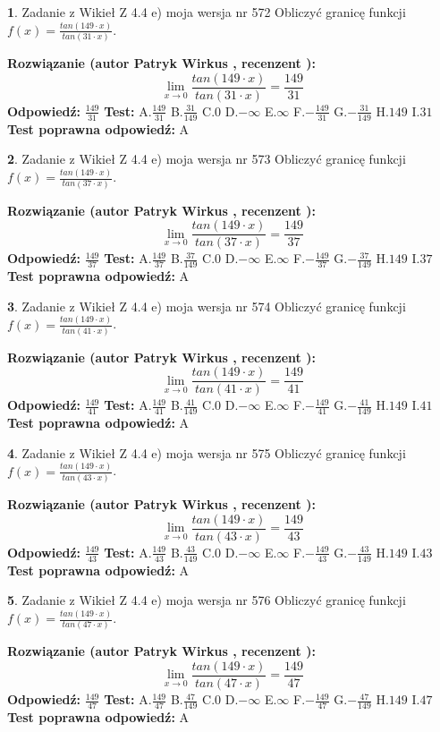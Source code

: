 \documentclass[12pt, a4paper]{article}
\theoremstyle{definition} %
\newtheorem{zad}{}
\newcommand{\zadStart}[1]{\begin{zad}#1\newline}
\newcommand{\zadStop}{\end{zad}}
\newcommand{\rozwStart}[2]{\noindent \textbf{Rozwiązanie (autor #1 , recenzent #2): }\newline}
\newcommand{\rozwStop}{\newline}
\newcommand{\odpStart}{\noindent \textbf{Odpowiedź:}\newline}
\newcommand{\odpStop}{\newline}
\newcommand{\testStart}{\noindent \textbf{Test:}\newline}
\newcommand{\testStop}{\newline}
\newcommand{\kluczStart}{\noindent \textbf{Test poprawna odpowiedź:}\newline}
\newcommand{\kluczStop}{\newline}
\begin{document}
\zadStart{Zadanie z Wikieł Z 4.4 e) moja wersja nr 572}
Obliczyć granicę funkcji $f(x)=\frac{tan(149\cdot x)}{tan(31\cdot x)}$.
\zadStop
\rozwStart{Patryk Wirkus}{}
$$\lim\limits_{x\to 0}\frac{tan(149\cdot x)}{tan(31\cdot x)}=
\frac{149}{31}$$
\rozwStop
\odpStart
$\frac{149}{31}$
\odpStop
\testStart
A.$\frac{149}{31}$
B.$\frac{31}{149}$
C.$0$
D.$-\infty$
E.$\infty$
F.$-\frac{149}{31}$
G.$-\frac{31}{149}$
H.$149$
I.$31$
\testStop
\kluczStart
A
\kluczStop



\zadStart{Zadanie z Wikieł Z 4.4 e) moja wersja nr 573}
Obliczyć granicę funkcji $f(x)=\frac{tan(149\cdot x)}{tan(37\cdot x)}$.
\zadStop
\rozwStart{Patryk Wirkus}{}
$$\lim\limits_{x\to 0}\frac{tan(149\cdot x)}{tan(37\cdot x)}=
\frac{149}{37}$$
\rozwStop
\odpStart
$\frac{149}{37}$
\odpStop
\testStart
A.$\frac{149}{37}$
B.$\frac{37}{149}$
C.$0$
D.$-\infty$
E.$\infty$
F.$-\frac{149}{37}$
G.$-\frac{37}{149}$
H.$149$
I.$37$
\testStop
\kluczStart
A
\kluczStop



\zadStart{Zadanie z Wikieł Z 4.4 e) moja wersja nr 574}
Obliczyć granicę funkcji $f(x)=\frac{tan(149\cdot x)}{tan(41\cdot x)}$.
\zadStop
\rozwStart{Patryk Wirkus}{}
$$\lim\limits_{x\to 0}\frac{tan(149\cdot x)}{tan(41\cdot x)}=
\frac{149}{41}$$
\rozwStop
\odpStart
$\frac{149}{41}$
\odpStop
\testStart
A.$\frac{149}{41}$
B.$\frac{41}{149}$
C.$0$
D.$-\infty$
E.$\infty$
F.$-\frac{149}{41}$
G.$-\frac{41}{149}$
H.$149$
I.$41$
\testStop
\kluczStart
A
\kluczStop



\zadStart{Zadanie z Wikieł Z 4.4 e) moja wersja nr 575}
Obliczyć granicę funkcji $f(x)=\frac{tan(149\cdot x)}{tan(43\cdot x)}$.
\zadStop
\rozwStart{Patryk Wirkus}{}
$$\lim\limits_{x\to 0}\frac{tan(149\cdot x)}{tan(43\cdot x)}=
\frac{149}{43}$$
\rozwStop
\odpStart
$\frac{149}{43}$
\odpStop
\testStart
A.$\frac{149}{43}$
B.$\frac{43}{149}$
C.$0$
D.$-\infty$
E.$\infty$
F.$-\frac{149}{43}$
G.$-\frac{43}{149}$
H.$149$
I.$43$
\testStop
\kluczStart
A
\kluczStop



\zadStart{Zadanie z Wikieł Z 4.4 e) moja wersja nr 576}
Obliczyć granicę funkcji $f(x)=\frac{tan(149\cdot x)}{tan(47\cdot x)}$.
\zadStop
\rozwStart{Patryk Wirkus}{}
$$\lim\limits_{x\to 0}\frac{tan(149\cdot x)}{tan(47\cdot x)}=
\frac{149}{47}$$
\rozwStop
\odpStart
$\frac{149}{47}$
\odpStop
\testStart
A.$\frac{149}{47}$
B.$\frac{47}{149}$
C.$0$
D.$-\infty$
E.$\infty$
F.$-\frac{149}{47}$
G.$-\frac{47}{149}$
H.$149$
I.$47$
\testStop
\kluczStart
A
\kluczStop
\end{document}
